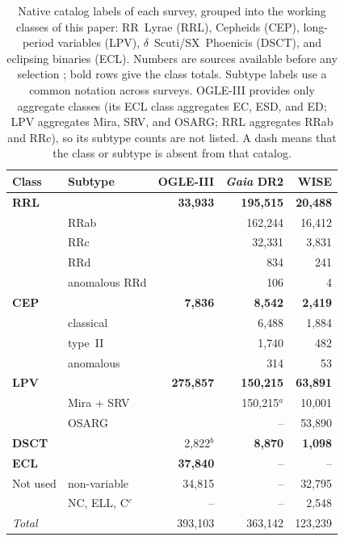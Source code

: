 \documentclass{aa}
\begin{document}
\begin{table}[htbp]\centering
\caption{Native catalog labels of each survey, grouped into the working
classes of this paper: RR~Lyrae (RRL), Cepheids (CEP), long-period
variables (LPV), $\delta$~Scuti/SX~Phoenicis (DSCT), and eclipsing binaries
(ECL). Numbers are sources available before any selection
\citep{becker2020scalable}; bold rows give the class totals. Subtype labels
use a common notation across surveys. OGLE-III provides only aggregate
classes (its ECL class aggregates EC, ESD, and ED; LPV aggregates Mira,
SRV, and OSARG; RRL aggregates RRab and RRc), so its subtype counts are
not listed. A dash means that the class or subtype is absent from that
catalog.}
\label{tab:survey_classes}
\footnotesize
\setlength{\tabcolsep}{3.5pt}
\begin{tabular}{@{}llrrr@{}}
\toprule
Class & Subtype & OGLE-III & \textit{Gaia} DR2 & WISE\\
\midrule
\textbf{RRL} & & \textbf{33{,}933} & \textbf{195{,}515} & \textbf{20{,}488}\\
 & RRab & & 162{,}244 & 16{,}412\\
 & RRc & & 32{,}331 & 3{,}831\\
 & RRd & & 834 & 241\\
 & anomalous RRd & & 106 & 4\\
\midrule
\textbf{CEP} & & \textbf{7{,}836} & \textbf{8{,}542} & \textbf{2{,}419}\\
 & classical & & 6{,}488 & 1{,}884\\
 & type~II & & 1{,}740 & 482\\
 & anomalous & & 314 & 53\\
\midrule
\textbf{LPV} & & \textbf{275{,}857} & \textbf{150{,}215} & \textbf{63{,}891}\\
 & Mira + SRV & & 150{,}215$^{a}$ & 10{,}001\\
 & OSARG & & -- & 53{,}890\\
\midrule
\textbf{DSCT} & & 2{,}822$^{b}$ & \textbf{8{,}870} & \textbf{1{,}098}\\
\textbf{ECL} & & \textbf{37{,}840} & -- & --\\
\midrule
Not used & non-variable & 34{,}815 & -- & 32{,}795\\
 & NC, ELL, C$^{c}$ & -- & -- & 2{,}548\\
\midrule
\emph{Total} & & 393{,}103 & 363{,}142 & 123{,}239\\
\bottomrule
\end{tabular}
\end{table}
\end{document}
